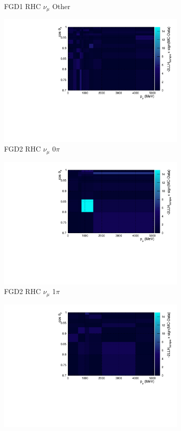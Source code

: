 \begin{figure}
\begin{subfigure}{.32\textwidth}
  \caption{FGD1 RHC $\nu_{\mu}$ Other}
  \label{fig:llhcont_FGD1_NuMuBkg_CCOther_in_AntiNu_Mode}
\end{subfigure}
\begin{subfigure}{.32\textwidth}
  \centering
  \includegraphics[width=0.85\linewidth]{figs/llhcont_FGD2_NuMuBkg_CC0pi_in_AntiNu_Mode.pdf}
  \caption{FGD2 RHC $\nu_{\mu}$ 0$\pi$}
  \label{fig:llhcont_FGD2_NuMuBkg_CC0pi_in_AntiNu_Mode}
\end{subfigure}
\begin{subfigure}{.32\textwidth}
  \centering
  \includegraphics[width=0.85\linewidth]{figs/llhcont_FGD2_NuMuBkg_CC1pi_in_AntiNu_Mode.pdf}
  \caption{FGD2 RHC $\nu_{\mu}$ 1$\pi$}
  \label{fig:llhcont_FGD2_NuMuBkg_CC1pi_in_AntiNu_Mode}
\end{subfigure}
\begin{subfigure}{.32\textwidth}
  \centering
  \includegraphics[width=0.85\linewidth]{figs/llhcont_FGD2_NuMuBkg_CCOther_in_AntiNu_Mode.pdf}

\end{subfigure}
\end{figure}
